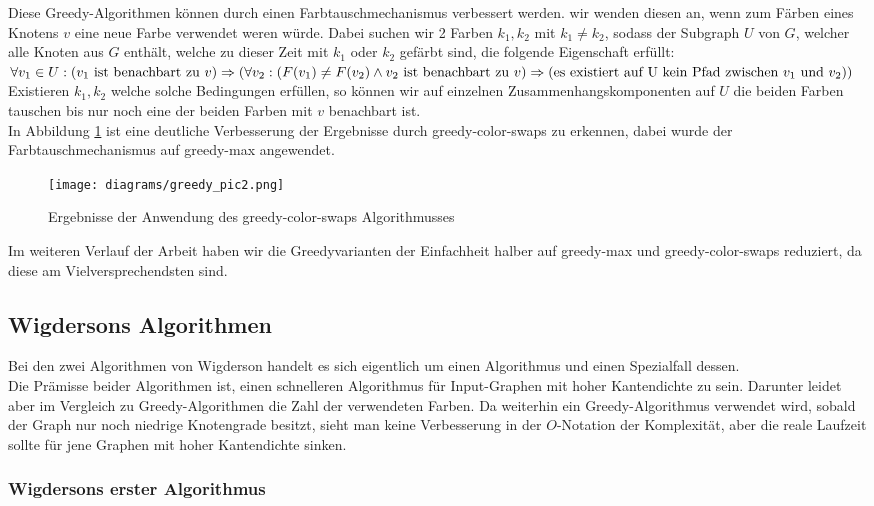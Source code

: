 \documentclass[11pt]{article}
\begin{document}
Diese Greedy-Algorithmen können durch einen Farbtauschmechanismus verbessert werden.
wir wenden diesen an, wenn zum Färben eines Knotens $v$ eine neue Farbe verwendet weren würde.
Dabei suchen wir 2 Farben $k_1,k_2$ mit $k_1\neq k_2$, 
sodass der Subgraph $U$ von $G$, 
welcher alle Knoten aus $G$ enthält, 
welche zu dieser Zeit mit $k_1$ oder $k_2$ gefärbt sind, die folgende Eigenschaft erfüllt:\\
$\forall v_1\in U : (v_1\text{ ist benachbart zu }v) \Rightarrow\\
 (\forall v_2 : (F(v_1)\neq F(v_2) \land v_2\text{ ist benachbart zu }v)\Rightarrow\\
  (\text{es existiert auf U kein Pfad zwischen $v_1$ und $v_2$}))$\\
Existieren $k_1,k_2$ welche solche Bedingungen erfüllen, 
so können wir auf einzelnen Zusammenhangskomponenten auf $U$ die beiden Farben tauschen 
bis nur noch eine der beiden Farben mit $v$ benachbart ist.\\
In Abbildung \ref{fig:greedy2} ist eine deutliche Verbesserung der Ergebnisse durch greedy-color-swaps zu erkennen,
dabei wurde der Farbtauschmechanismus auf greedy-max angewendet.
\begin{figure}
  \texttt{[image: diagrams/greedy\_pic2.png]}
  \caption{Ergebnisse der Anwendung des greedy-color-swaps Algorithmusses}
  \label{fig:greedy2}
\end{figure}
Im weiteren Verlauf der Arbeit haben wir die Greedyvarianten der Einfachheit halber auf greedy-max und greedy-color-swaps reduziert, 
da diese am Vielversprechendsten sind.

\subsection{Wigdersons Algorithmen} %

Bei den zwei Algorithmen von Wigderson handelt es sich eigentlich um einen Algorithmus und einen Spezialfall dessen. \\
Die Prämisse beider Algorithmen ist, einen schnelleren Algorithmus für Input-Graphen mit hoher Kantendichte zu sein.
Darunter leidet aber im Vergleich zu Greedy-Algorithmen die Zahl der verwendeten Farben. Da weiterhin ein Greedy-Algorithmus verwendet wird,
sobald der Graph nur noch niedrige Knotengrade besitzt, sieht man keine Verbesserung in der $O$-Notation der Komplexität, aber die reale Laufzeit sollte
für jene Graphen mit hoher Kantendichte sinken.

\subsubsection{Wigdersons erster Algorithmus}
\end{document}
